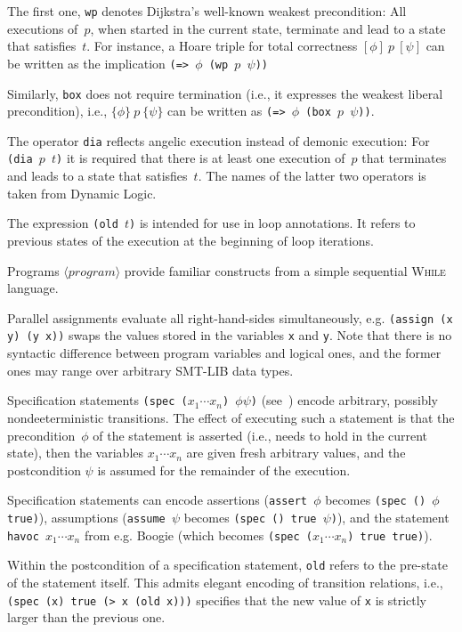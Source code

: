 \documentclass[fleqn]{llncs}
\newcommand{\code}[1]{\texttt{#1}}
\newcommand{\hoare}[3]{\{ #1 \}~#2~\{ #3 \}}
\newcommand{\hoaretotal}[3]{[ #1 ]~#2~[ #3 ]}
\newcommand{\nonterminal}[1]{\ensuremath{\langle \mathit{#1} \rangle}}
\begin{document}
The first one, \code{wp} denotes Dijkstra's well-known weakest precondition:
All executions of~$p$, when started in the current state, terminate and lead to a state that satisfies~$t$.
For instance, a Hoare triple for total correctness $\hoaretotal{\phi}{p}{\psi}$ can be written as the implication \code{(=> $\phi$ (wp $p$ $\psi$))}

Similarly, \code{box} does not require termination (i.e., it expresses the weakest liberal precondition),
i.e., $\hoare{\phi}{p}{\psi}$ can be written as \code{(=> $\phi$ (box $p$ $\psi$))}.

The operator \code{dia} reflects angelic execution instead of demonic execution:
For \code{(dia $p$ $t$)} it is required that there is at least one execution of~$p$
that terminates and leads to a state that satisfies~$t$.
The names of the latter two operators is taken from Dynamic Logic.

The expression \code{(old $t$)} is intended for use in loop annotations.
It refers to previous states of the execution at the beginning of loop iterations.

\medskip

Programs \nonterminal{program} provide familiar constructs from a simple sequential \textsc{While} language.

Parallel assignments evaluate all right-hand-sides simultaneously,
e.g. \code{(assign (x y)  (y x))} swaps the values stored in the variables \code{x} and \code{y}.
Note that there is no syntactic difference between program variables and logical ones,
and the former ones may range over arbitrary SMT-LIB data types.

Specification statements \code{(spec ($x_1 \cdots x_n$) $\phi \psi$)} (see~\cite{morgan1988specification})
encode arbitrary, possibly nondeeterministic transitions.
The effect of executing such a statement is that the precondition~$\phi$ of the statement
is asserted (i.e., needs to hold in the current state),
then the variables \code{$x_1 \cdots x_n$} are given fresh arbitrary values,
and the postcondition $\psi$ is assumed for the remainder of the execution.

Specification statements can encode assertions (\code{assert $\phi$} becomes \code{(spec () $\phi$ true)}),
assumptions (\code{assume $\psi$} becomes \code{(spec () true $\psi$)}),
and the statement \code{havoc $x_1 \cdots x_n$} from e.g. Boogie
(which becomes \code{(spec ($x_1 \cdots x_n$) true true)}).

Within the postcondition of a specification statement, \code{old} refers to the pre-state of the statement itself.
This admits elegant encoding of transition relations,
i.e., \code{(spec (x) true (> x (old x)))} specifies that the new value of \code{x} is strictly larger than the previous one.
\end{document}
